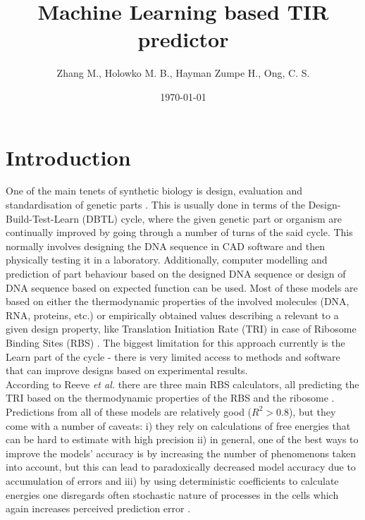 \documentclass{article}
\title{Machine Learning based TIR predictor}
\author{Zhang M., Holowko M. B., Hayman Zumpe H., Ong, C. S.}
\date{\today{}}
\begin{document}
\maketitle

\section{Introduction}

One of the main tenets of synthetic biology is design, evaluation and standardisation of genetic parts \cite{Brophy2014,Canton2008,Stanton2014}. This is usually done in terms of the Design-Build-Test-Learn (DBTL) cycle, where the given genetic part or organism are continually improved by going through a number of turns of the said cycle. This normally involves designing the DNA sequence in CAD software and then physically testing it in a laboratory. Additionally, computer modelling and prediction of part behaviour based on the designed DNA sequence or design of DNA sequence based on expected function can be used\cite{Yeoh2019,Nielsen2016}. Most of these models are based on either the thermodynamic properties of the involved molecules (DNA, RNA, proteins, etc.) or empirically obtained values describing a relevant to a given design property, like Translation Initiation Rate (TRI) in case of Ribosome Binding Sites (RBS) \cite{Xia1998,Chen2013,Reeve2014}. The biggest limitation for this approach currently is the Learn part of the cycle - there is very limited access to methods and software that can improve designs based on experimental results.\\
According to Reeve \emph{et al.} there are three main RBS calculators, all predicting the TRI based on the thermodynamic properties of the RBS and the ribosome \cite{Seo2013,Na2010,Salis2009}. Predictions from all of these models are relatively good ($R^2 >0.8$), but they come with a number of caveats: i) they rely on calculations of free energies that can be hard to estimate with high precision ii) in general, one of the best ways to improve the models' accuracy is by increasing the number of phenomenons taken into account, but this can lead to paradoxically decreased model accuracy due to accumulation of errors \cite{EspahBorujeni2016} and iii) by using deterministic coefficients to calculate energies one disregards often stochastic nature of processes in the cells which again increases perceived prediction error \cite{Goss1998}. \\
\end{document}

